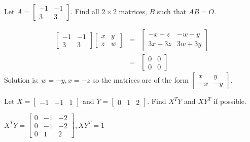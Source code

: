 \documentclass{ximera}
\begin{document}
\begin{problem}\label{prb:4.12} Let $A=\left[
\begin{array}{rr}
-1 & -1 \\
3 & 3
\end{array}
\right] $. Find all $2\times 2$ matrices, $B$
such that $AB=O.$
\begin{hint}
\begin{eqnarray*}
\left[
\begin{array}{rr}
-1 & -1 \\
3 & 3
\end{array}
\right] \left[
\begin{array}{cc}
x & y \\
z & w
\end{array}
\right]  &=&\left[
\begin{array}{cc}
-x-z & -w-y \\
3x+3z & 3w+3y
\end{array}
\right]  \\
&=&\left[
\begin{array}{cc}
0 & 0 \\
0 & 0
\end{array}
\right]
\end{eqnarray*}
Solution is: $ w=-y,x=-z $ so the
matrices are of the form $\left[
\begin{array}{rr}
x & y \\
-x & -y
\end{array}
\right].$
\end{hint}
\end{problem}


\begin{problem}\label{prb:4.13} Let $X=\left[
\begin{array}{rrr}
-1 & -1 & 1
\end{array}
\right] $ and $Y=\left[
\begin{array}{rrr}
0 & 1 & 2
\end{array}
\right] .$ Find $X^{T}Y$ and $XY^{T}$ if
possible.
\begin{hint}
$X^{T}Y = \left[ \begin{array}{rrr}
0 & -1 & -2 \\
0 & -1 & -2 \\
0 & 1 & 2
\end{array}
\right] , XY^{T} = 1$
\end{hint}
\end{problem}
\end{document}
